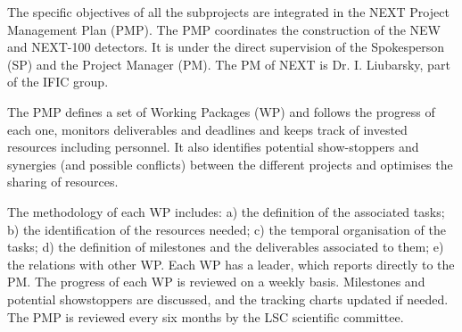 The specific objectives of all the subprojects are integrated in the NEXT Project Management Plan (PMP). The PMP coordinates the construction of the NEW and NEXT-100 detectors. It is under the direct supervision of the Spokesperson (SP) and the Project Manager (PM). The PM of NEXT is Dr. I. Liubarsky, part of the IFIC group. 

The PMP defines a set of Working Packages (WP) and follows the progress of each one, monitors deliverables and deadlines and keeps track of invested resources including personnel. It also identifies potential show-stoppers and synergies (and possible conflicts) between the different projects and optimises the sharing of resources. 



The methodology of each WP includes: a) the definition of the associated tasks; b) the identification of the resources needed; c) the temporal organisation of the tasks; d) the definition of milestones and the deliverables associated to them; e) the relations with other WP. Each WP has a leader, which reports directly to the PM. The progress of each WP is reviewed on a weekly basis. Milestones and potential showstoppers are discussed, and the tracking charts updated if needed. The PMP is reviewed every six months by the LSC scientific committee.  